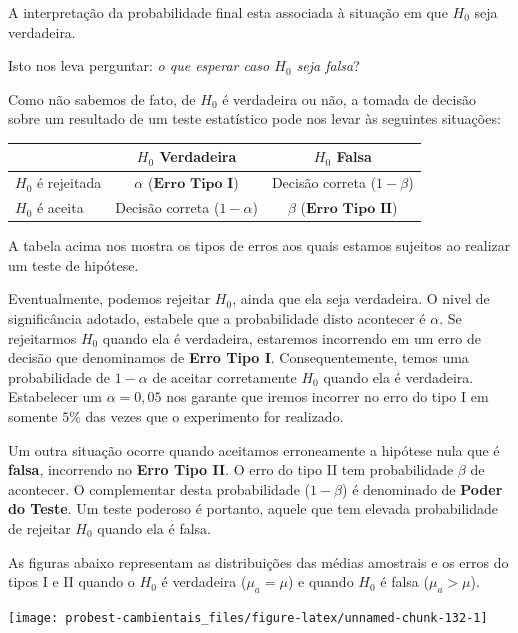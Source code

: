 \documentclass[
]{book}
\begin{document}
A interpretação da probabilidade final esta associada à situação em que \(H_0\) seja verdadeira.

Isto nos leva perguntar: \emph{o que esperar caso \(H_0\) seja falsa}?

Como não sabemos de fato, de \(H_0\) é verdadeira ou não, a tomada de decisão sobre um resultado de um teste estatístico pode nos levar às seguintes situações:

\begin{longtable}[]{@{}lcc@{}}
\toprule
& \(H_0\) Verdadeira & \(H_0\) Falsa \\
\midrule
\endhead
\(H_0\) é rejeitada & \(\alpha\) (\(\textbf{Erro Tipo I}\)) & Decisão correta (\(1-\beta\)) \\
\(H_0\) é aceita & Decisão correta (\(1-\alpha\)) & \(\beta\) (\(\textbf{Erro Tipo II}\)) \\
\bottomrule
\end{longtable}

A tabela acima nos mostra os tipos de erros aos quais estamos sujeitos ao realizar um teste de hipótese.

Eventualmente, podemos rejeitar \(H_0\), ainda que ela seja verdadeira. O nivel de significância adotado, estabele que a probabilidade disto acontecer é \(\alpha\). Se rejeitarmos \(H_0\) quando ela é verdadeira, estaremos incorrendo em um erro de decisão que denominamos de \textbf{Erro Tipo I}. Consequentemente, temos uma probabilidade de \(1 - \alpha\) de aceitar corretamente \(H_0\) quando ela é verdadeira. Estabelecer um \(\alpha = 0,05\) nos garante que iremos incorrer no erro do tipo I em somente \(5\%\) das vezes que o experimento for realizado.

Um outra situação ocorre quando aceitamos erroneamente a hipótese nula que é \textbf{falsa}, incorrendo no \textbf{Erro Tipo II}. O erro do tipo II tem probabilidade \(\beta\) de acontecer. O complementar desta probabilidade (\(1-\beta\)) é denominado de \textbf{Poder do Teste}. Um teste poderoso é portanto, aquele que tem elevada probabilidade de rejeitar \(H_0\) quando ela é falsa.

As figuras abaixo representam as distribuições das médias amostrais e os erros do tipos I e II quando o \(H_0\) é verdadeira (\(\mu_a = \mu\)) e quando \(H_0\) é falsa (\(\mu_a > \mu\)).

\begin{center}\texttt{[image: probest-cambientais\_files/figure-latex/unnamed-chunk-132-1]} \end{center}
\end{document}
